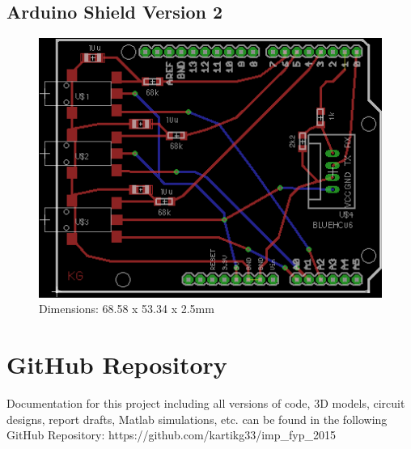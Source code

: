 \subsection{Arduino Shield Version 2}
\label{ardshieldpcb2}
\begin{figure}[H]
\centering
\includegraphics[scale = 1.5]{Images/ard_pcb_02}
\\ Dimensions: 68.58 x 53.34 x 2.5mm
\end{figure}


\section{GitHub Repository} \label{GitHub}

Documentation for this project including all versions of code, 3D models, circuit designs, report drafts, Matlab simulations, etc. can be found in the following GitHub Repository: https://github.com/kartikg33/imp\_fyp\_2015




